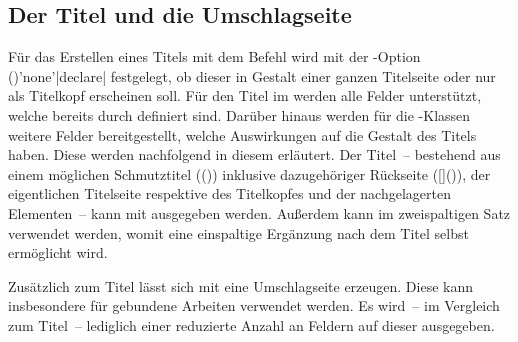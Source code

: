 \begin{Declaration*}{}
\begin{Declaration*}{}
\begin{Declaration*}{}
\subsection{Der Titel und die Umschlagseite}
%
%
%
%
%
Für das Erstellen eines Titels mit dem Befehl  wird mit der 
\KOMAScript-Option 
()'none'|declare| 
festgelegt, ob dieser in Gestalt einer ganzen Titelseite oder nur als Titelkopf 
erscheinen soll. Für den Titel im \TUDCD werden alle Felder unterstützt, welche 
bereits durch \KOMAScript{} definiert sind. Darüber hinaus werden für die 
\TUDScript-Klassen weitere Felder bereitgestellt, welche Auswirkungen auf die 
Gestalt des Titels haben. Diese werden nachfolgend in diesem \autorefname 
erläutert. Der Titel~-- bestehend aus einem möglichen Schmutztitel 
(()) inklusive dazugehöriger Rückseite 
([]()), der 
eigentlichen Titelseite respektive des Titelkopfes und der nachgelagerten 
Elementen~-- kann mit  ausgegeben werden. Außerdem kann im 
zweispaltigen Satz  verwendet werden, womit eine 
einspaltige Ergänzung nach dem Titel selbst ermöglicht wird.

Zusätzlich zum Titel lässt sich mit  eine Umschlagseite 
erzeugen. Diese kann insbesondere für gebundene Arbeiten verwendet werden. Es 
wird~-- im Vergleich zum Titel~-- lediglich einer reduzierte Anzahl an Feldern 
auf dieser ausgegeben.


\end{Declaration*}
\end{Declaration*}
\end{Declaration*}
